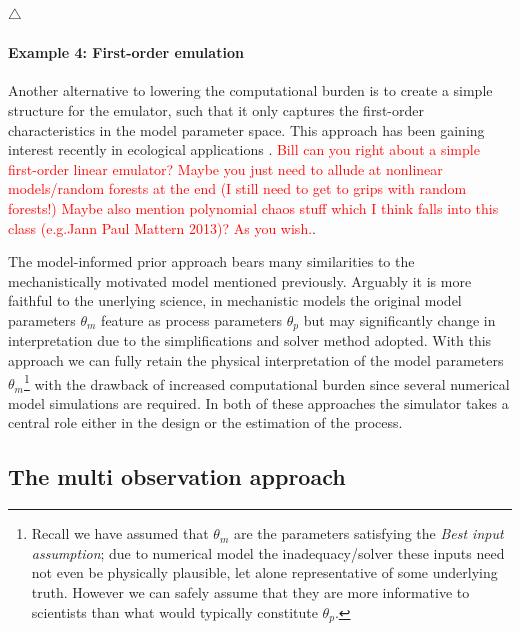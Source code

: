 \documentclass[10pt,a4paper]{article}
\newcommand\xqed[1]{%
  \leavevmode\unskip\penalty9999 \hbox{}\nobreak\hfill
  \quad\hbox{#1}}
\newcommand\demo{\xqed{$\triangle$}}
\newcommand{\red}{\textcolor{red}}
\begin{document}
\demo

\paragraph{Example 4: First-order emulation} Another alternative to lowering the computational burden is to create a simple structure for the emulator, such that it only captures the first-order characteristics in the model parameter space. This approach has been gaining interest recently in ecological applications \citep{Hooten_2011,Leeds_2013}. \red{Bill can you right about a simple first-order linear emulator? Maybe you just need to allude at nonlinear models/random forests at the end (I still need to get to grips with random forests!) Maybe also mention polynomial chaos stuff which I think falls into this class (e.g.Jann Paul Mattern 2013)? As you wish.}. 



The model-informed prior approach bears many similarities to the mechanistically motivated model mentioned previously. Arguably it is more faithful to the unerlying science, in mechanistic models the original model parameters $\theta_m$ feature as process parameters $\theta_p$ but may significantly change in interpretation due to the simplifications and solver method adopted. With this approach we can fully retain the physical interpretation of the model parameters $\theta_m$\footnote{Recall we have assumed that $\theta_m$ are the parameters satisfying the \emph{Best input assumption}; due to numerical model the inadequacy/solver these inputs need not even be physically plausible, let alone representative of some underlying truth. However we can safely assume that they are more informative to scientists than what would typically constitute $\theta_p$.} with the drawback of increased computational burden since several numerical model simulations are required. In both of these approaches the simulator takes a central role either in the design or the estimation of the process. 



\subsection{The multi observation approach}
\end{document}

